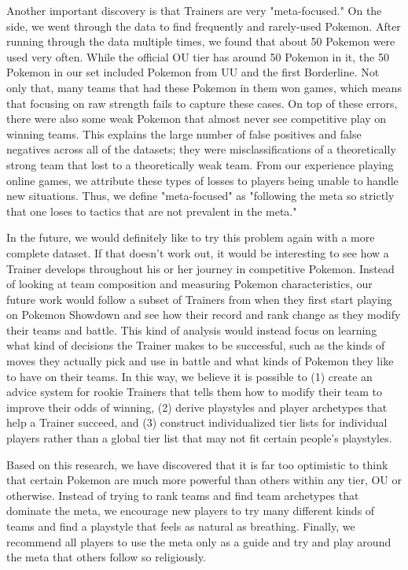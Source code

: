 \documentclass{acm_proc_article-sp}
\begin{document}
Another important discovery is that Trainers are very "meta-focused." On the side, we went through the data to find frequently and rarely-used Pokemon. After running through the data multiple times, we found that about 50 Pokemon were used very often. While the official OU tier has around 50 Pokemon in it, the 50 Pokemon in our set included Pokemon from UU and the first Borderline. Not only that, many teams that had these Pokemon in them won games, which means that focusing on raw strength fails to capture these cases. On top of these errors, there were also some weak Pokemon that almost never see competitive play on winning teams. This explains the large number of false positives and false negatives across all of the datasets; they were misclassifications of a theoretically strong team that lost to a theoretically weak team. From our experience playing online games, we attribute these types of losses to players being unable to handle new situations. Thus, we define "meta-focused" as "following the meta so strictly that one loses to tactics that are not prevalent in the meta."

In the future, we would definitely like to try this problem again with a more complete dataset. If that doesn't work out, it would be interesting to see how a Trainer develops throughout his or her journey in competitive Pokemon. Instead of looking at team composition and measuring Pokemon characteristics, our future work would follow a subset of Trainers from when they first start playing on Pokemon Showdown and see how their record and rank change as they modify their teams and battle. This kind of analysis would instead focus on learning what kind of decisions the Trainer makes to be successful, such as the kinds of moves they actually pick and use in battle and what kinds of Pokemon they like to have on their teams. In this way, we believe it is possible to (1) create an advice system for rookie Trainers that tells them how to modify their team to improve their odds of winning, (2) derive playstyles and player archetypes that help a Trainer succeed, and (3) construct individualized tier lists for individual players rather than a global tier list that may not fit certain people's playstyles.

Based on this research, we have discovered that it is far too optimistic to think that certain Pokemon are much more powerful than others within any tier, OU or otherwise. Instead of trying to rank teams and find team archetypes that dominate the meta, we encourage new players to try many different kinds of teams and find a playstyle that feels as natural as breathing. Finally, we recommend all players to use the meta only as a guide and try and play around the meta that others follow so religiously.
\end{document}
